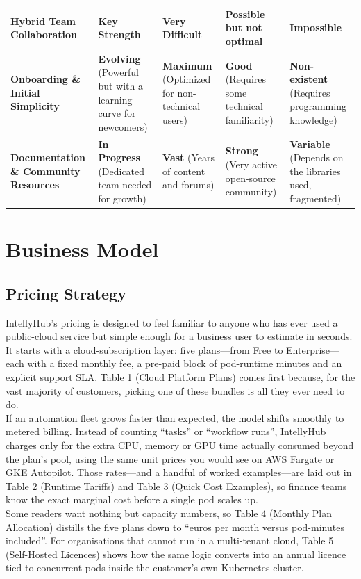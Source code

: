 \documentclass[11pt, a4paper, oneside]{article}
\begin{document}
\begin{table}[H]
{\begin{tabularx}{1.2\textwidth}{lLLLL}
\addlinespace
\textbf{Hybrid Team Collaboration} & \textbf{Key Strength} & \textbf{Very Difficult} & \textbf{Possible but not optimal} & \textbf{Impossible} \\
\addlinespace
\textbf{Onboarding \& Initial Simplicity} & \textbf{Evolving} (Powerful but with a learning curve for newcomers) & \textbf{Maximum} (Optimized for non-technical users) & \textbf{Good} (Requires some technical familiarity) & \textbf{Non-existent} (Requires programming knowledge) \\
\addlinespace
\textbf{Documentation \& Community Resources} & \textbf{In Progress} (Dedicated team needed for growth) & \textbf{Vast} (Years of content and forums) & \textbf{Strong} (Very active open-source community) & \textbf{Variable} (Depends on the libraries used, fragmented) \\
\bottomrule
\end{tabularx}%
}
\end{table}

\section{Business Model}
\subsection{Pricing Strategy}
IntellyHub's pricing is designed to feel familiar to anyone who has ever used a public-cloud service but simple enough for a business user to estimate in seconds. It starts with a cloud-subscription layer: five plans—from Free to Enterprise—each with a fixed monthly fee, a pre-paid block of pod-runtime minutes and an explicit support SLA. Table 1 (Cloud Platform Plans) comes first because, for the vast majority of customers, picking one of these bundles is all they ever need to do.\\

If an automation fleet grows faster than expected, the model shifts smoothly to metered billing. Instead of counting “tasks” or “workflow runs”, IntellyHub charges only for the extra CPU, memory or GPU time actually consumed beyond the plan's pool, using the same unit prices you would see on AWS Fargate or GKE Autopilot. Those rates—and a handful of worked examples—are laid out in Table 2 (Runtime Tariffs) and Table 3 (Quick Cost Examples), so finance teams know the exact marginal cost before a single pod scales up.\\

Some readers want nothing but capacity numbers, so Table 4 (Monthly Plan Allocation) distills the five plans down to “euros per month versus pod-minutes included”. For organisations that cannot run in a multi-tenant cloud, Table 5 (Self-Hosted Licences) shows how the same logic converts into an annual licence tied to concurrent pods inside the customer's own Kubernetes cluster.\\
\end{document}
